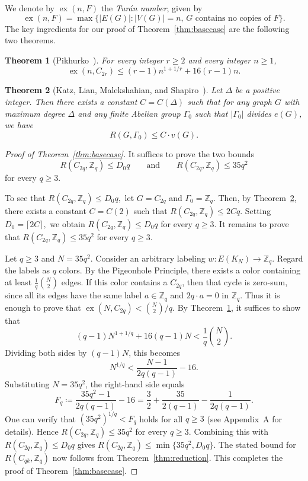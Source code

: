 \documentclass[11pt]{article}
\newtheorem{theorem}{Theorem}[section]
\theoremstyle{remark}
\newcommand{\Z}{\mathbb Z}
\newcommand{\ex}{\operatorname{ex}}
\begin{document}
We denote by $\ex(n,F)$ the \emph{Tur\'an number}, given by
\[
    \ex(n,F)=\max\{|E(G)|\colon |V(G)|=n,\,G\text{ contains no copies of }F\}.
\]
The key ingredients for our proof of Theorem~\ref{thm:basecase} are the following two theorems.

\begin{theorem}[Pikhurko~{\cite{Pikhurko2012}}]\label{thm:pikhurko}
    For every integer $r\ge 2$ and every integer $n\ge 1$,
    \[
        \ex(n,C_{2r})\le (r-1)n^{1+1/r}+16(r-1)n.
    \]
\end{theorem}

\begin{theorem}[Katz, Lian, Malekshahian, and Shapiro~\cite{KLMS2025}]\label{thm:KLMS}
    Let $\Delta$ be a positive integer.
    Then there exists a constant $C = C(\Delta)$ such that for any graph $G$ with maximum degree $\Delta$ and any finite Abelian group $\Gamma_0$ such that $|\Gamma_0|$ divides $e(G)$, we have
    \[R(G,\Gamma_0) \le C \cdot v(G).\]
\end{theorem}

\begin{proof}[Proof of Theorem~\ref{thm:basecase}]
    It suffices to prove the two bounds
    \[
        R(C_{2q},\Z_q)\le D_0q
        \qquad\text{and}\qquad
        R(C_{2q},\Z_q)\le 35q^2
    \]
    for every $q\ge 3$.

    To see that $R(C_{2q},\Z_q)\le D_0q,$ let $G=C_{2q}$ and $\Gamma_0=\Z_q.$
    Then, by Theorem~\ref{thm:KLMS}, there exists a constant $C = C(2)$ such that $R(C_{2q},\Z_q)\le 2Cq.$
    Setting $D_0=\lceil 2C\rceil,$ we obtain $R(C_{2q},\Z_q)\le D_0q$ for every $q\ge 3.$
    It remains to prove that $R(C_{2q},\Z_q)\le 35q^2$ for every $q\ge 3.$

    Let $q\ge 3$ and $N=35q^2$.
    Consider an arbitrary labeling $w\colon E(K_N)\to \Z_q$.
    Regard the labels as $q$ colors.
    By the Pigeonhole Principle, there exists a color containing at least $\frac1q\binom N2$ edges.
    If this color contains a $C_{2q}$, then that cycle is zero-sum, since all its edges have the same label $a\in\Z_q$ and
    $2q\cdot a=0$ in $\Z_q$.
    Thus it is enough to prove that $\ex(N,C_{2q})<
        \binom N2/q$.
    By Theorem~\ref{thm:pikhurko}, it suffices to show that
    \[
        (q-1)N^{1+1/q}+16(q-1)N<
        \frac1q\binom N2.
    \]
    Dividing both sides by $(q-1)N$, this becomes
    \[
        N^{1/q}<\frac{N-1}{2q(q-1)}-16.
    \]
    Substituting $N=35q^2$, the right-hand side equals
    \[
        F_q\coloneqq\frac{35q^2-1}{2q(q-1)}-16
        =\frac32+\frac{35}{2(q-1)}-\frac{1}{2q(q-1)}.
    \]
    One can verify that $(35q^2)^{1/q}<F_q$ holds for all $q\ge 3$ (see Appendix~A for details).
    Hence $R(C_{2q},\Z_q)\le 35q^2$ for every $q\ge3$.
    Combining this with $R(C_{2q},\Z_q)\le D_0q$ gives
    $R(C_{2q},\Z_q)\le \min\{35q^2,D_0q\}$.
    The stated bound for $R(C_{qk},\Z_q)$ now follows from Theorem~\ref{thm:reduction}.
    This completes the proof of Theorem~\ref{thm:basecase}.
\end{proof}
\end{document}
